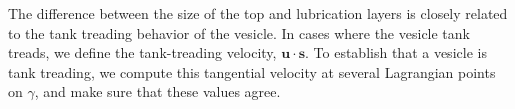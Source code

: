 \documentclass[twoside,twocolumn,9pt]{article}
\renewcommand{\ss}{\mathbf{s}}
\newcommand{\uu}{\mathbf{u}}
\newcommand{\subfigimg}[3][,]{%
  \setbox1=\hbox{\texttt{[image: \#3]}}%
  \leavevmode\rlap{\usebox1}%
  \rlap{\hspace*{0pt}\raisebox{\dimexpr\ht1-0\baselineskip}{\bf
  \normalsize #2}}%
  \phantom{\usebox1}%
}
\begin{document}

The difference between the size of the top and lubrication layers is closely related to the tank treading behavior of the vesicle. In cases where the vesicle tank treads, we define the tank-treading velocity, $\uu \cdot \ss$. To establish that a vesicle is tank treading, we compute this tangential velocity at several Lagrangian points on $\gamma$, and make sure that these values agree.

\end{document}
